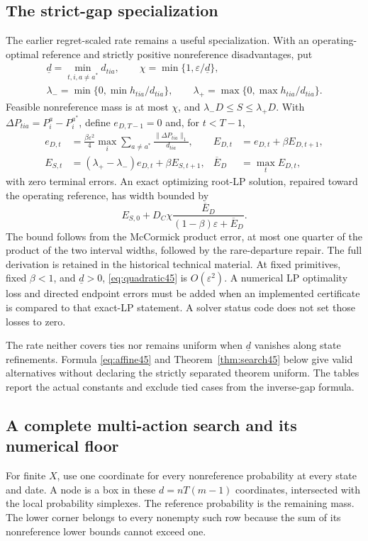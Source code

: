 \subsection{The strict-gap specialization}\label{sec:quadratic45}
The earlier regret-scaled rate remains a useful specialization. With an operating-optimal reference and strictly positive nonreference disadvantages, put
\[
 \begin{gathered}
 \underline d=\min_{t,i,a\ne a^*}d_{tia},\qquad \chi=\min\{1,\varepsilon/\underline d\},\\
 \lambda_- =\min\{0,\min h_{tia}/d_{tia}\},\qquad
 \lambda_+ =\max\{0,\max h_{tia}/d_{tia}\}.
 \end{gathered}
\]
Feasible nonreference mass is at most $\chi$, and $\lambda_-D\le S\le\lambda_+D$. With $\Delta P_{tia}=P_i^a-P_i^{a^*}$, define $e_{D,T-1}=0$ and, for $t<T-1$,
\begin{align}
 e_{D,t}&=\frac{\beta\varepsilon^2}{4}\max_i\sum_{a\ne a^*}
             \frac{\|\Delta P_{tia}\|_1}{d_{tia}},&
 E_{D,t}&=e_{D,t}+\beta E_{D,t+1},\label{eq:ED45}\\
 E_{S,t}&=(\lambda_+-\lambda_-)e_{D,t}+\beta E_{S,t+1},&
 \overline E_D&=\max_tE_{D,t},\nonumber
\end{align}
with zero terminal errors. An exact optimizing root-LP solution, repaired toward the operating reference, has width bounded by
\begin{equation}\label{eq:quadratic45}
 E_{S,0}+D_C\chi\frac{\overline E_D}{(1-\beta)\varepsilon+\overline E_D}.
\end{equation}
The bound follows from the McCormick product error, at most one quarter of the product of the two interval widths, followed by the rare-departure repair. The full derivation is retained in the historical technical material. At fixed primitives, fixed $\beta<1$, and $\underline d>0$, \eqref{eq:quadratic45} is $O(\varepsilon^2)$. A numerical LP optimality loss and directed endpoint errors must be added when an implemented certificate is compared to that exact-LP statement. A solver status code does not set those losses to zero.

The rate neither covers ties nor remains uniform when $\underline d$ vanishes along state refinements. Formula \eqref{eq:affine45} and Theorem~\ref{thm:search45} below give valid alternatives without declaring the strictly separated theorem uniform. The tables report the actual constants and exclude tied cases from the inverse-gap formula.

\subsection{A complete multi-action search and its numerical floor}\label{sec:tree45}
For finite $X$, use one coordinate for every nonreference probability at every state and date. A node is a box in these $d=nT(m-1)$ coordinates, intersected with the local probability simplexes. The reference probability is the remaining mass. The lower corner belongs to every nonempty such row because the sum of its nonreference lower bounds cannot exceed one.

